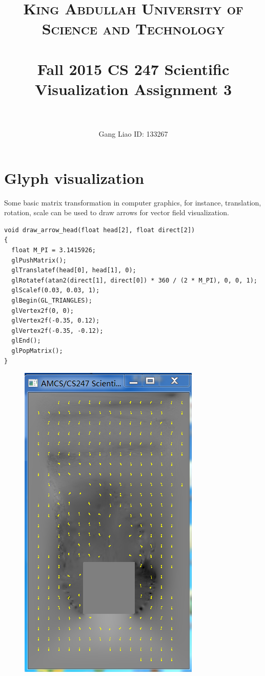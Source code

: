 \documentclass[12pt,letterpaper,fleqn]{article}          %
\title{
		\usefont{OT1}{bch}{b}{n}
		\normalfont \normalsize \textsc{ \fontspec{Zapfino} King Abdullah University of Science and Technology} \\ [25pt]
		\horrule{0.5pt} \\[0.4cm]
         \Large Fall 2015 CS 247 Scientific Visualization Assignment 3\\
		\horrule{2pt} \\
}
\author{Gang Liao \hspace{1.05cm} ID: 133267 }
\begin{document}
\maketitle

\onehalfspacing

\section{Glyph visualization}
Some basic matrix transformation in computer graphics, for instance, translation, rotation, scale can be used to draw arrows for vector field visualization.

\begin{lstlisting}
void draw_arrow_head(float head[2], float direct[2])
{
  float M_PI = 3.1415926;
  glPushMatrix();
  glTranslatef(head[0], head[1], 0);
  glRotatef(atan2(direct[1], direct[0]) * 360 / (2 * M_PI), 0, 0, 1);
  glScalef(0.03, 0.03, 1);
  glBegin(GL_TRIANGLES);
  glVertex2f(0, 0);
  glVertex2f(-0.35, 0.12);
  glVertex2f(-0.35, -0.12);
  glEnd();
  glPopMatrix();
}
\end{lstlisting}


	
\begin{figure}[!htb]
\centering
\includegraphics[scale=0.70]{4}
\end{figure}
\end{document}

